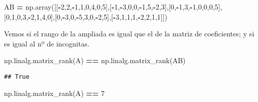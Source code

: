 \documentclass[
]{article}
\newenvironment{Shaded}{\begin{snugshade}}{\end{snugshade}}
\newcommand{\DecValTok}[1]{\textcolor[rgb]{0.00,0.00,0.81}{#1}}
\newcommand{\NormalTok}[1]{#1}
\newcommand{\OperatorTok}[1]{\textcolor[rgb]{0.81,0.36,0.00}{\textbf{#1}}}
\begin{document}
\begin{Shaded}
\begin{Highlighting}[]
\NormalTok{AB }\OperatorTok{=}\NormalTok{ np.array([[}\OperatorTok{-}\DecValTok{2}\NormalTok{,}\DecValTok{2}\NormalTok{,}\OperatorTok{-}\DecValTok{1}\NormalTok{,}\DecValTok{1}\NormalTok{,}\DecValTok{0}\NormalTok{,}\DecValTok{4}\NormalTok{,}\DecValTok{0}\NormalTok{,}\DecValTok{5}\NormalTok{],[}\OperatorTok{-}\DecValTok{1}\NormalTok{,}\OperatorTok{-}\DecValTok{3}\NormalTok{,}\DecValTok{0}\NormalTok{,}\DecValTok{0}\NormalTok{,}\OperatorTok{-}\DecValTok{1}\NormalTok{,}\DecValTok{5}\NormalTok{,}\OperatorTok{-}\DecValTok{2}\NormalTok{,}\DecValTok{3}\NormalTok{],[}\DecValTok{0}\NormalTok{,}\OperatorTok{-}\DecValTok{1}\NormalTok{,}\DecValTok{3}\NormalTok{,}\OperatorTok{-}\DecValTok{1}\NormalTok{,}\DecValTok{0}\NormalTok{,}\DecValTok{0}\NormalTok{,}\DecValTok{0}\NormalTok{,}\DecValTok{5}\NormalTok{],[}\DecValTok{0}\NormalTok{,}\DecValTok{1}\NormalTok{,}\DecValTok{0}\NormalTok{,}\DecValTok{3}\NormalTok{,}\OperatorTok{-}\DecValTok{2}\NormalTok{,}\DecValTok{1}\NormalTok{,}\DecValTok{4}\NormalTok{,}\DecValTok{0}\NormalTok{],[}\DecValTok{0}\NormalTok{,}\OperatorTok{-}\DecValTok{3}\NormalTok{,}\DecValTok{0}\NormalTok{,}\OperatorTok{-}\DecValTok{5}\NormalTok{,}\DecValTok{3}\NormalTok{,}\DecValTok{0}\NormalTok{,}\OperatorTok{-}\DecValTok{2}\NormalTok{,}\DecValTok{5}\NormalTok{],[}\OperatorTok{-}\DecValTok{3}\NormalTok{,}\DecValTok{1}\NormalTok{,}\DecValTok{1}\NormalTok{,}\DecValTok{1}\NormalTok{,}\OperatorTok{-}\DecValTok{2}\NormalTok{,}\DecValTok{2}\NormalTok{,}\DecValTok{1}\NormalTok{,}\DecValTok{1}\NormalTok{]])}
\end{Highlighting}
\end{Shaded}

Vemos si el rango de la ampliada es igual que el de la matriz de
coeficientes; y si es igual al nº de incognitas.

\begin{Shaded}
\begin{Highlighting}[]
\NormalTok{np.linalg.matrix_rank(A) }\OperatorTok{==}\NormalTok{ np.linalg.matrix_rank(AB)}
\end{Highlighting}
\end{Shaded}

\begin{verbatim}
## True
\end{verbatim}

\begin{Shaded}
\begin{Highlighting}[]
\NormalTok{np.linalg.matrix_rank(A) }\OperatorTok{==} \DecValTok{7}
\end{Highlighting}
\end{Shaded}
\end{document}
